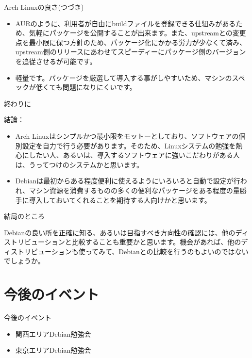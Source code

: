 \begin{frame}{Arch Linuxの良さ(つづき)}
\begin{itemize}
\item AURのように、利用者が自由にbuildファイルを登録できる仕組みがあるため、気軽にパッケージを公開することが出来ます。また、upstreamとの変更点を最小限に保つ方針のため、パッケージ化にかかる労力が少なくて済み、upstream側のリリースにあわせてスピーディーにパッケージ側のバージョンを追従させるが可能です。
\item 軽量です。パッケージを厳選して導入する事がしやすいため、マシンのスペックが低くても問題になりにくいです。
\end{itemize}
\end{frame}

\begin{frame}{終わりに}

結論：
\begin{itemize}
  \item Arch Linuxはシンプルかつ最小限をモットーとしており、ソフトウェアの個別設定を自力で行う必要があります。そのため、Linuxシステムの勉強を熱心にしたい人、あるいは、導入するソフトウェアに強いこだわりがある人は、うってつけのシステムかと思います。
 \item Debianは最初からある程度便利に使えるようにいろいろと自動で設定が行われ、マシン資源を消費するものの多くの便利なパッケージをある程度の量勝手に導入しておいてくれることを期待する人向けかと思います。
\end{itemize}
\end{frame}

\begin{frame}{結局のところ}

 Debianの良い所を正確に知る、あるいは目指すべき方向性の確認には、他のディストリビューションと比較することも重要かと思います。機会があれば、他のディストリビューションも使ってみて、Debianとの比較を行うのもよいのではないでしょうか。

\end{frame}

\section{今後のイベント}
\begin{frame}{今後のイベント}
\begin{itemize}
 \item 関西エリアDebian勉強会
 \item 東京エリアDebian勉強会　
\end{itemize}
\end{frame}

